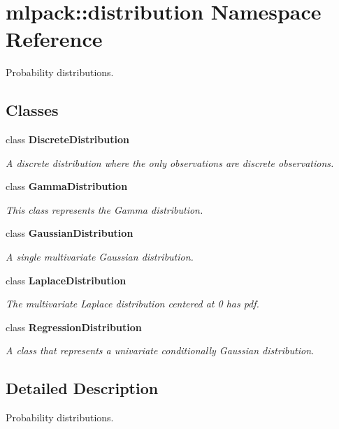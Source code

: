 \section{mlpack\+:\+:distribution Namespace Reference}
\label{namespacemlpack_1_1distribution}


Probability distributions.  


\subsection*{Classes}
\begin{DoxyCompactItemize}
\item 
class {\bf Discrete\+Distribution}
\begin{DoxyCompactList}\small\item\em A discrete distribution where the only observations are discrete observations. \end{DoxyCompactList}\item 
class {\bf Gamma\+Distribution}
\begin{DoxyCompactList}\small\item\em This class represents the Gamma distribution. \end{DoxyCompactList}\item 
class {\bf Gaussian\+Distribution}
\begin{DoxyCompactList}\small\item\em A single multivariate Gaussian distribution. \end{DoxyCompactList}\item 
class {\bf Laplace\+Distribution}
\begin{DoxyCompactList}\small\item\em The multivariate Laplace distribution centered at 0 has pdf. \end{DoxyCompactList}\item 
class {\bf Regression\+Distribution}
\begin{DoxyCompactList}\small\item\em A class that represents a univariate conditionally Gaussian distribution. \end{DoxyCompactList}\end{DoxyCompactItemize}


\subsection{Detailed Description}
Probability distributions. 

